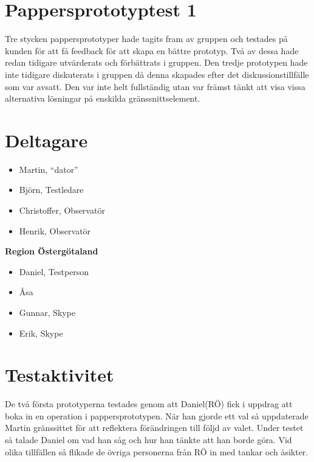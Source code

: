 \section{Pappersprototyptest 1}
Tre stycken pappersprototyper hade tagits fram av gruppen och testades på kunden för att få feedback för att skapa en bättre prototyp. Två av dessa hade redan tidigare utvärderats och förbättrats i gruppen. Den tredje prototypen hade inte tidigare diskuterats i gruppen då denna skapades efter det diskussionstillfälle som var avsatt. Den var inte helt fullständig utan var främst tänkt att visa vissa alternativa lösningar på enskilda gränssnittselement.
\section{Deltagare}
\begin{itemize}
\item Martin, “dator”
\item Björn, Testledare
\item Christoffer, Observatör
\item Henrik, Observatör
\end{itemize}

\textbf{Region Östergötaland}
\begin{itemize}
\item Daniel, Testperson
\item Åsa
\item Gunnar, Skype
\item Erik, Skype
\end{itemize}
\section{Testaktivitet}
De två första prototyperna testades genom att Daniel(RÖ) fick i uppdrag att boka in en operation i pappersprototypen. När han gjorde ett val så uppdaterade Martin gränssittet för att reflektera förändringen till följd av valet. Under testet så talade Daniel om vad han såg och hur han tänkte att han borde göra. Vid olika tillfällen så flikade de övriga personerna från RÖ in med tankar och åsikter.
